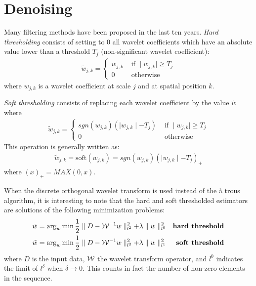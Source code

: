 \section{Denoising}
Many filtering methods have been proposed in the last ten years. {\em Hard thresholding} consists of setting to 0 all 
wavelet coefficients which have an absolute value lower than a threshold $T_j$ (non-significant wavelet coefficient):
\begin{eqnarray}  \tilde w_{j,k} = 
\left\{ \begin{array}{ll} w_{j,k} &  \mbox{ if } \mid w_{j,k} \mid \geq T_j  \nonumber  \\ 

0 &  \mbox{ otherwise}  \end{array} \right. 
\end{eqnarray}
where $w_{j,k}$ is a wavelet coefficient at scale $j$ and at spatial position $k$. 

{\em Soft thresholding} consists of replacing each wavelet coefficient by the value $\tilde w$ where
\begin{eqnarray}  \tilde w_{j,k} = 
\left\{ \begin{array}{ll} sgn(w_{j,k}) ( \mid w_{j,k} \mid - T_j)    &  \mbox{ if } \mid w_{j,k} \mid \geq T_j \nonumber  \\ 
0 &  \mbox{ otherwise}  \end{array} \right. 
\end{eqnarray} 
This operation is generally written as:
\begin{eqnarray} 
 \tilde w_{j,k} = \mathrm{soft}( w_{j,k})  = sgn(w_{j,k}) ( \mid w_{j,k} \mid - T_j)_{+}
\end{eqnarray} 
where $(x)_{+} = MAX(0,x)$.

When the discrete orthogonal wavelet transform is used instead of the \og{}\`a trous \fg{} algorithm, it is interesting to note
that the hard and soft thresholded estimators are solutions of the following minimization problems:
\begin{eqnarray*}
  \tilde w  =   \mathrm{arg}_w \min {1 \over 2} \parallel D - {\cal W}^{-1} w \parallel^2_{l^2} + 
 \lambda \parallel w \parallel^2_{l^0} & & \mbox{\bf   hard threshold} \nonumber \\
  \tilde w   =   \mathrm{arg}_w \min {1 \over 2} \parallel D - {\cal W}^{-1} w \parallel^2_{l^2} + 
 \lambda \parallel w \parallel^2_{l^1} & & \mbox{\bf   soft threshold}  
\end{eqnarray*}
where $D$ is the input data, ${\cal W}$ the wavelet transform operator, and $l^0$ indicates the limit of $l^\delta$ 
when $\delta \rightarrow 0$. This counts in fact the number of non-zero elements in the sequence.

